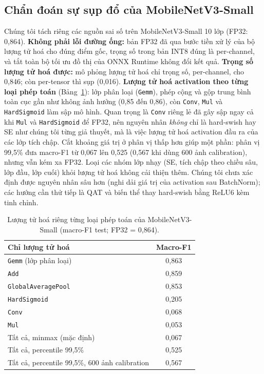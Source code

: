 \documentclass[10pt,a4paper,twocolumn]{article}
\begin{document}
\subsection{Chẩn đoán sự sụp đổ của MobileNetV3-Small}
\label{sec:diag}
Chúng tôi tách riêng các nguồn sai số trên MobileNetV3-Small 10 lớp (FP32: 0,864).
\textbf{Không phải lỗi đường ống:} bản FP32 đã qua bước tiền xử lý của bộ lượng tử hoá cho đúng điểm gốc, trọng số trong bản INT8 đúng là per-channel, và tắt toàn bộ tối ưu đồ thị của ONNX Runtime không đổi kết quả.
\textbf{Trọng số lượng tử hoá được:} mô phỏng lượng tử hoá chỉ trọng số, per-channel, cho 0,846; còn per-tensor thì sụp (0,016).
\textbf{Lượng tử hoá activation theo từng loại phép toán} (Bảng~\ref{tab:diag}): lớp phân loại (\texttt{Gemm}), phép cộng và gộp trung bình toàn cục gần như không ảnh hưởng (0,85 đến 0,86), còn \texttt{Conv}, \texttt{Mul} và \texttt{HardSigmoid} làm sập mô hình. Quan trọng là \texttt{Conv} riêng lẻ đã gây sập ngay cả khi \texttt{Mul} và \texttt{HardSigmoid} để FP32, nên nguyên nhân \emph{không} chỉ là hard-swish hay SE như chúng tôi từng giả thuyết, mà là việc lượng tử hoá activation đầu ra của các lớp tích chập.
Cắt khoảng giá trị ở phân vị thấp hơn giúp một phần: phân vị 99,5\% đưa macro-F1 từ 0,067 lên 0,525 (0,567 khi dùng 600 ảnh calibration), nhưng vẫn kém xa FP32. Loại các nhóm lớp nhạy (SE, tích chập theo chiều sâu, lớp đầu, lớp cuối) khỏi lượng tử hoá không cải thiện thêm. Chúng tôi chưa xác định được nguyên nhân sâu hơn (nghi dải giá trị của activation sau BatchNorm); các hướng cần thử tiếp là QAT và biến thể thay hard-swish bằng ReLU6 kèm tinh chỉnh.

\begin{table}[t]
\centering\small
\caption{Lượng tử hoá riêng từng loại phép toán của MobileNetV3-Small (macro-F1 test; FP32 = 0,864).}
\label{tab:diag}
\begin{tabular}{@{}lc@{}}
\toprule
Chỉ lượng tử hoá & Macro-F1 \\
\midrule
\texttt{Gemm} (lớp phân loại) & 0,863 \\
\texttt{Add} & 0,859 \\
\texttt{GlobalAveragePool} & 0,853 \\
\texttt{HardSigmoid} & 0,205 \\
\texttt{Conv} & 0,068 \\
\texttt{Mul} & 0,053 \\
\midrule
Tất cả, minmax (mặc định) & 0,067 \\
Tất cả, percentile 99,5\% & 0,525 \\
Tất cả, percentile 99,5\%, 600 ảnh calibration & 0,567 \\
\bottomrule
\end{tabular}
\end{table}
\end{document}
